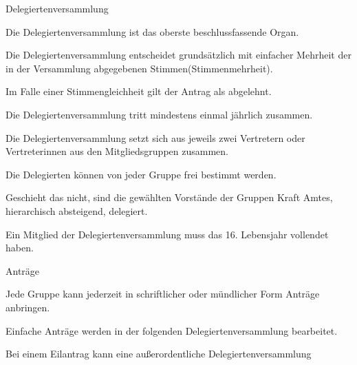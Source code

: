 \begin{legal}
\begin{legal}
        \end{legal}
    \item Delegiertenversammlung
        \begin{legal}
            \item Die Delegiertenversammlung ist das oberste beschlussfassende Organ.
            \item Die Delegiertenversammlung entscheidet grundsätzlich mit einfacher Mehrheit der 
                  in der Versammlung abgegebenen Stimmen(Stimmenmehrheit).
            \item Im Falle einer Stimmengleichheit gilt der Antrag als abgelehnt.
            \item Die Delegiertenversammlung tritt mindestens einmal jährlich zusammen.
            \item Die Delegiertenversammlung setzt sich aus jeweils zwei Vertretern oder 
                  Vertreterinnen aus den Mitgliedsgruppen zusammen.
                \begin{legal}
                    \item Die Delegierten können von jeder Gruppe frei bestimmt werden.
                    \item Geschieht das nicht, sind die gewählten Vorstände der Gruppen Kraft Amtes, 
                          hierarchisch absteigend, delegiert.
                \end{legal}
            \item Ein Mitglied der Delegiertenversammlung muss das 16. Lebensjahr vollendet haben.
            \item Anträge
                \begin{legal}
                    \item Jede Gruppe kann jederzeit in schriftlicher oder mündlicher Form Anträge 
                          anbringen.
                    \item Einfache Anträge werden in der folgenden Delegiertenversammlung 
                          bearbeitet.
                    \item Bei einem Eilantrag kann eine außerordentliche Delegiertenversammlung 

\end{legal}
\end{legal}
\end{legal}
